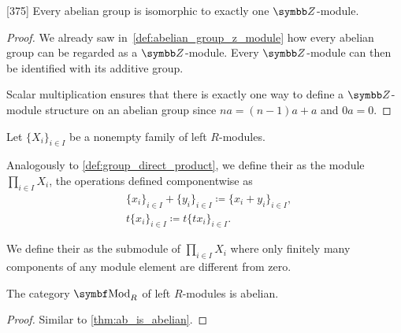 \begin{proposition}\label{thm:abelian_group_iff_z_module}\cite{Knapp2016BAlg}[375]
  Every abelian group is isomorphic to exactly one \( \Z \)-module.
\end{proposition}
\begin{proof}
  We already saw in~\cref{def:abelian_group_z_module} how every abelian group can be regarded as a \( \Z \)-module. Every \( \Z \)-module can then be identified with its additive group.

  Scalar multiplication ensures that there is exactly one way to define a \( \Z \)-module structure on an abelian group since \( na = (n-1)a + a \) and \( 0a = 0 \).
\end{proof}

\begin{definition}\label{def:left_module_direct_product}
  Let \( \{ X_i \}_{i \in I} \) be a nonempty family of left \( R \)-modules.

  Analogously to \cref{def:group_direct_product}, we define their  as the module \( \prod_{i \in I} X_i \), the operations defined componentwise as
  \begin{align*}
    &\{ x_i \}_{i \in I} + \{ y_i \}_{i \in I}
    \coloneqq
    \{ x_i + y_i \}_{i \in I}, \\
    &t \{ x_i \}_{i \in I}
    \coloneqq
    t \{ t x_i \}_{i \in I}.
  \end{align*}

  We define their  as the submodule of \( \prod_{i \in I} X_i \) where only finitely many components of any module element are different from zero.
\end{definition}

\begin{proposition}\label{thm:mod_r_is_abelian}
  The category \( \Cat{Mod}_R \) of left \( R \)-modules is abelian.
\end{proposition}
\begin{proof}
  Similar to \cref{thm:ab_is_abelian}.
\end{proof}

